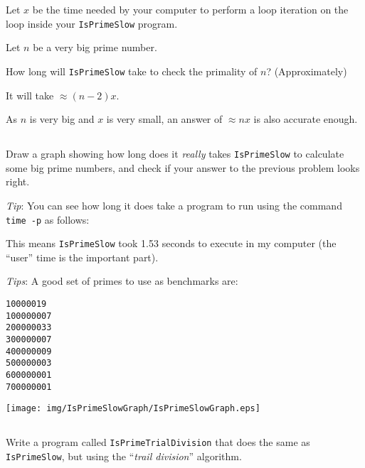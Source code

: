 \documentclass[a4paper, 12pt]{article}
\begin{document}
Let $x$ be the time needed by your computer to perform a loop iteration on the
loop inside your \texttt{IsPrimeSlow} program.

Let $n$ be a very big prime number.

How long will \texttt{IsPrimeSlow} take to check the primality of $n$?
(Approximately)

\begin{solution}
It will take $\approx(n-2)x$.

As $n$ is very big and $x$ is very small, an answer of $\approx nx$ is also
accurate enough.
\end{solution}

\subsection{}

Draw a graph showing how long does it \emph{really} takes \texttt{IsPrimeSlow}
to calculate some big prime numbers, and check if your answer to the previous
problem looks right.

\textsl{Tip}: You can see how long it does take a program to run using the
command \texttt{time -p} as follows:


This means \texttt{IsPrimeSlow} took 1.53 seconds to execute in my
computer (the ``user'' time is the important part).

\textsl{Tips}: A good set of primes to use as benchmarks are:

\begin{verbatim}
10000019
100000007
200000033
300000007
400000009
500000003
600000001
700000001
\end{verbatim}

\begin{solution}
  \centering
  \texttt{[image: img/IsPrimeSlowGraph/IsPrimeSlowGraph.eps]}
\end{solution}

\subsection{}

Write a program called \texttt{IsPrimeTrialDivision} that does the same as
\texttt{IsPrimeSlow}, but using the ``\emph{trail division}'' algorithm.
\end{document}

